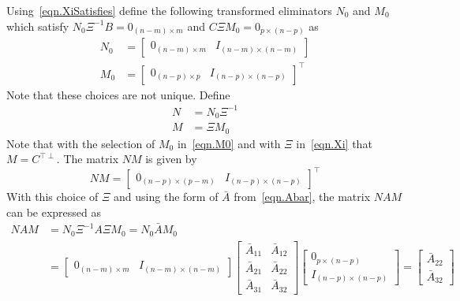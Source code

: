 Using\ \eqref{eqn.XiSatisfies} define the following transformed eliminators $N_{0}$ and $M_{0}$ which satisfy $N_{0}\Xi^{-1}B=0_{(n-m)\times m}$ and $C\Xi M_{0}=0_{p\times(n-p)}$ as
\begin{align}
  \label{eqn.N0}
  N_{0}&=
  \begin{bmatrix}
    0_{(n-m)\times m} & I_{(n-m)\times(n-m)}
  \end{bmatrix} \\
  \label{eqn.M0}
  M_{0}&=
  \begin{bmatrix}
    0_{(n-p)\times p} & I_{(n-p)\times(n-p)}
  \end{bmatrix}^{\top}
\end{align}
Note that these choices are not unique.
Define
\begin{align}
  \label{eqn.N}
  N&=N_{0}\Xi^{-1} \\
  \label{eqn.M}
  M&=\Xi M_{0}
\end{align}
Note that with the selection of $M_{0}$ in\ \eqref{eqn.M0} and with $\Xi$ in\ \eqref{eqn.Xi} that $M=C^{\top\perp}$.
The matrix $NM$ is given by
\begin{equation}
  \label{eqn.NM}
  NM=
  \begin{bmatrix}
    0_{(n-p)\times(p-m)} & I_{(n-p)\times(n-p)}
  \end{bmatrix}^{\top}
\end{equation}
With this choice of $\Xi$ and using the form of $\bar{A}$ from\ \eqref{eqn.Abar}, the matrix $NAM$ can be expressed as
\begin{equation}
  \label{eqn.NAM}
  \begin{split}
    NAM &=
    N_{0}\Xi^{-1}A\Xi M_{0} =
    N_{0}\bar{A}M_{0} \\
    &=
    \begin{bmatrix}
      0_{(n-m)\times m} & I_{(n-m)\times(n-m)}
    \end{bmatrix}
    \left[
    \begin{array}{c|c} %
      \bar{A}_{11} & \bar{A}_{12} \\
      \hline %
      \bar{A}_{21} & \bar{A}_{22} \\
      \hline %
      \bar{A}_{31} & \bar{A}_{32}
    \end{array}\right]
    \begin{bmatrix}
      0_{p\times(n-p)} \\ I_{(n-p)\times(n-p)}
    \end{bmatrix} =
    \begin{bmatrix}
      \bar{A}_{22} \\
      \bar{A}_{32}
    \end{bmatrix} \\
  \end{split}
\end{equation}
